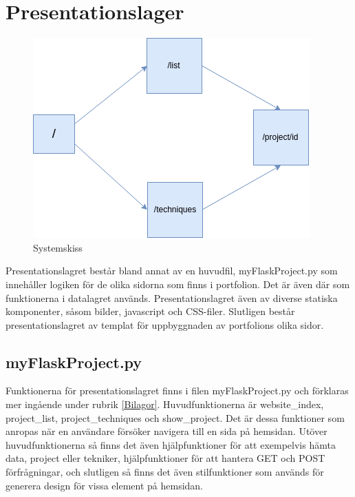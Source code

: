 \documentclass{TDP003mall}
\begin{document}
\pagebreak
\section{Presentationslager}


\begin{figure}[h]
  \centering
  \includegraphics[scale=0.7]{presentationslager}
  \caption{Systemskiss}

\end{figure}


Presentationslagret består bland annat av en huvudfil, myFlaskProject.py som innehåller logiken för de olika sidorna som finns i portfolion. Det är även där som funktionerna i datalagret används. Presentationslagret även av diverse statiska komponenter, såsom bilder, javascript och CSS-filer. Slutligen består presentationslagret av templat för uppbyggnaden av portfolions olika sidor.




\subsection{myFlaskProject.py}

Funktionerna för presentationslagret finns i filen myFlaskProject.py och förklaras mer ingående under rubrik \ref{Bilagor}. Huvudfunktionerna är website\_index, project\_list, project\_techniques och show\_project. Det är dessa funktioner som anropas när en användare försöker navigera till en sida på hemsidan. Utöver huvudfunktionerna så finns det även hjälpfunktioner för att exempelvis hämta data, project eller tekniker, hjälpfunktioner för att hantera GET och POST förfrågningar, och slutligen så finns det även stilfunktioner som används för generera design för vissa element på hemsidan.
\end{document}
